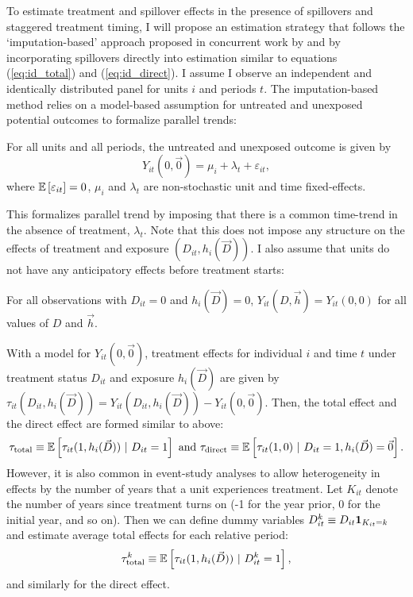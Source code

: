 \documentclass[11pt]{article}
\begin{document}
To estimate treatment and spillover effects in the presence of spillovers and staggered treatment timing, I will propose an estimation strategy that follows the `imputation-based' approach proposed in concurrent work by \citet{Gardner_2021} and \citet{Borusyak_Jaravel_Spiess_2021} by incorporating spillovers directly into estimation similar to equations (\ref{eq:id_total}) and (\ref{eq:id_direct}). I assume I observe an independent and identically distributed panel for units $i$ and periods $t$. The imputation-based method relies on a model-based assumption for untreated and unexposed potential outcomes to formalize parallel trends:
\begin{assumption}\label{assumption:parallel_staggered}
    For all units and all periods, the untreated and unexposed outcome is given by
    \begin{equation}\label{eq:y0_staggered}
        Y_{it}(0, \vec{0}) = \mu_i + \lambda_t + \varepsilon_{it},
    \end{equation}
    where $\mathbb{E}\left[\varepsilon_{it}\right] = 0$, $\mu_i$ and $\lambda_t$ are non-stochastic unit and time fixed-effects.
\end{assumption}
This formalizes parallel trend by imposing that there is a common time-trend in the absence of treatment, $\lambda_t$. Note that this does not impose any structure on the effects of treatment and exposure $(D_{it}, h_i(\vec{D}))$. I also assume that units do not have any anticipatory effects before treatment starts:
\begin{assumption}\label{assumption:no-anticipation_staggered}
    For all observations with $D_{it} = 0$ and $h_i(\vec{D}) = 0$, $Y_{it}(D, \vec{h}) = Y_{it}(0,0)$ for all values of $D$ and $\vec{h}$.
\end{assumption}

With a model for $Y_{it}(0, \vec{0})$, treatment effects for individual $i$ and time $t$ under treatment status $D_{it}$ and exposure $h_i(\vec{D})$ are given by $\tau_{it}(D_{it}, h_i(\vec{D})) = Y_{it}(D_{it}, h_i(\vec{D})) - Y_{it}(0, \vec{0})$. Then, the total effect and the direct effect are formed similar to above:
\[
    \tau_{\text{total}} \equiv \mathbb{E}\left[ \tau_{it}(1, h_i(\vec{D})) \ \vert \ D_{it} = 1\right] \text{ and }
    \tau_{\text{direct}} \equiv \mathbb{E}\left[ \tau_{it}(1, 0) \ \vert \ D_{it} = 1, h_i(\vec{D}) = \vec{0}\right].
\]
However, it is also common in event-study analyses to allow heterogeneity in effects by the number of years that a unit experiences treatment. Let $K_{it}$ denote the number of years since treatment turns on (-1 for the year prior, 0 for the initial year, and so on). Then we can define dummy variables $D_{it}^k \equiv D_{it} \mathbf{1}_{K_{it} = k}$ and estimate average total effects for each relative period: 
\[
    \tau_{\text{total}}^k \equiv \mathbb{E}\left[ \tau_{it}(1, h_i(\vec{D})) \ \vert \ D_{it}^k = 1\right],
\]
and similarly for the direct effect.
\end{document}
